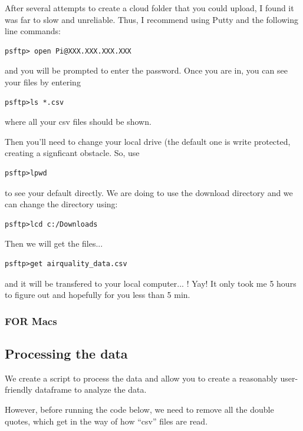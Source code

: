 \documentclass{article}\usepackage[]{graphicx}\usepackage[]{color}
\begin{document}
After several attempts to create a cloud folder that you could upload, I found it was far to slow and unreliable. Thus, I recommend using Putty and the following line commands:

\begin{lstlisting}
psftp> open Pi@XXX.XXX.XXX.XXX
\end{lstlisting}

and you will be prompted to enter the password. Once you are in, you can see your files by entering

\begin{lstlisting}
psftp>ls *.csv
\end{lstlisting}


\noindent where all your csv files should be shown. 

Then you'll need to change your local drive (the default one is write protected, creating a signficant obstacle. So, use 

\begin{lstlisting}
psftp>lpwd
\end{lstlisting}
 

\noindent to see your default directly. We are doing to use the download directory and we can change the directory using:

\begin{lstlisting}
psftp>lcd c:/Downloads
\end{lstlisting}

Then we will get the files...

\begin{lstlisting}
psftp>get airquality_data.csv
\end{lstlisting}


and it will be transfered to your local computer... !  Yay!  It only took me 5 hours to figure out and hopefully for you less than 5 min. 

\subsubsection{FOR Macs}



\subsection{Processing the data}

We create a script to process the data and allow you to create a reasonably user-friendly dataframe to analyze the data.

However, before running the code below, we need to remove all the double quotes, which get in the way of how ``csv'' files are read. 
\end{document}
